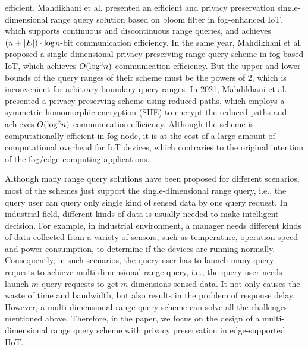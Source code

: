 \documentclass[IEEE JOURNAL OF BIOMEDICAL AND HEALTH INFORMATICS]{IEEEtran}
\begin{document}
efficient. Mahdikhani et al. \cite{mahdikhani2020IoT} presented an efficient and privacy preservation single-dimensional range query solution based on bloom filter in fog-enhanced IoT, which supports continuous and discontinuous range queries, and achieves $(n+|E|)\cdot \rm {log}$$n$-bit communication efficiency. In the same year, Mahdikhani et al. \cite{hasan2020IoT} proposed a single-dimensional privacy-preserving range query scheme in fog-based IoT, which achieves $O({\rm log^{3}}n)$ communication efficiency. But the upper and lower bounds of the query ranges of their scheme must be the powers of $2$, which is inconvenient for arbitrary boundary query ranges. In 2021, Mahdikhani et al. \cite{mahdikhani2020using} presented a privacy-preserving scheme using reduced paths, which employs a symmetric homomorphic encryption (SHE) to encrypt the reduced paths and achieves $O({\rm log^{2}}n)$ communication efficiency. Although the scheme is computationally efficient in fog node, it is at the cost of a large amount of computational overhead for IoT devices, which contraries to the original intention of the fog/edge computing applications.

\iffalse
Although many range query solutions have been proposed for different scenarios, most of the schemes just support the single-dimensional range query, i.e., the query user can query only single kind of sensed data by one query request. Therefore, the query user has to launch $m$ query requests to achieve $m$-dimensional range query, which causes significant inconvenience. In industrial field, different kinds of data is usually needed to make intelligent decision. For example, in industrial environment, a manager needs different kinds of data collected from a variety of sensors, such as temperature, operation speed and power consumption, to determine if the devices are running normally. Therefore, multi-dimensional range query . Therefore, we focus on solving the challenge of multi-dimensional range query with privacy preservation in edge-supported IIoT. 
\fi

Although many range query solutions have been proposed for different scenarios, most of the schemes just support the single-dimensional range query, i.e., the query user can query only single kind of sensed data by one query request. In industrial field, different kinds of data is usually needed to make intelligent decision. For example, in industrial environment, a manager needs different kinds of data collected from a variety of sensors, such as temperature, operation speed and power consumption, to determine if the devices are running normally. Consequently, in such scenarios, the query user has to launch many query requests to achieve multi-dimensional range query, i.e., the query user needs launch $m$ query requests to get $m$ dimensions sensed data. It not only causes the waste of time and bandwidth, but also results in the problem of response delay. However, a multi-dimensional range query scheme can solve all the challenges mentioned above. Therefore, in the paper, we focus on the design of a multi-dimensional range query scheme with privacy preservation in edge-supported IIoT. 
\end{document}
